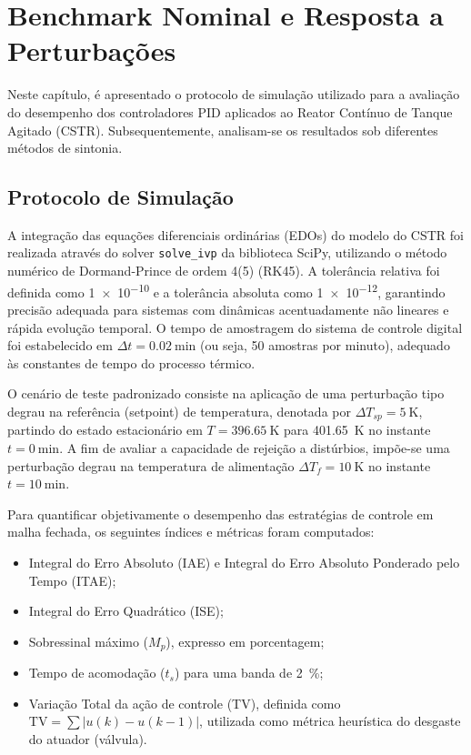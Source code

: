 \chapter{Benchmark Nominal e Resposta a Perturbações}
\label{cap:benchmark}

Neste capítulo, é apresentado o protocolo de simulação utilizado para a avaliação do desempenho dos controladores PID aplicados ao Reator Contínuo de Tanque Agitado (CSTR). Subsequentemente, analisam-se os resultados sob diferentes métodos de sintonia.

\section{Protocolo de Simulação}
\label{sec:protocolo_simulacao}

A integração das equações diferenciais ordinárias (EDOs) do modelo do CSTR foi realizada através do solver \texttt{solve\_ivp} da biblioteca SciPy, utilizando o método numérico de Dormand-Prince de ordem 4(5) (RK45). A tolerância relativa foi definida como \num{1e-10} e a tolerância absoluta como \num{1e-12}, garantindo precisão adequada para sistemas com dinâmicas acentuadamente não lineares e rápida evolução temporal. O tempo de amostragem do sistema de controle digital foi estabelecido em $\Delta t = \SI{0.02}{\minute}$ (ou seja, \num{50} amostras por minuto), adequado às constantes de tempo do processo térmico.

O cenário de teste padronizado consiste na aplicação de uma perturbação tipo degrau na referência (setpoint) de temperatura, denotada por $\Delta T_{sp} = \SI{+5}{\kelvin}$, partindo do estado estacionário em $T = \SI{396.65}{\kelvin}$ para \SI{401.65}{\kelvin} no instante $t = \SI{0}{\minute}$. A fim de avaliar a capacidade de rejeição a distúrbios, impõe-se uma perturbação degrau na temperatura de alimentação $\Delta T_{f} = \SI{+10}{\kelvin}$ no instante $t = \SI{10}{\minute}$.

Para quantificar objetivamente o desempenho das estratégias de controle em malha fechada, os seguintes índices e métricas foram computados:
\begin{itemize}
    \item Integral do Erro Absoluto (IAE) e Integral do Erro Absoluto Ponderado pelo Tempo (ITAE);
    \item Integral do Erro Quadrático (ISE);
    \item Sobressinal máximo ($M_p$), expresso em porcentagem;
    \item Tempo de acomodação ($t_s$) para uma banda de \SI{2}{\percent};
    \item Variação Total da ação de controle (TV), definida como $\text{TV} = \sum |u(k) - u(k-1)|$, utilizada como métrica heurística do desgaste do atuador (válvula).
\end{itemize}

